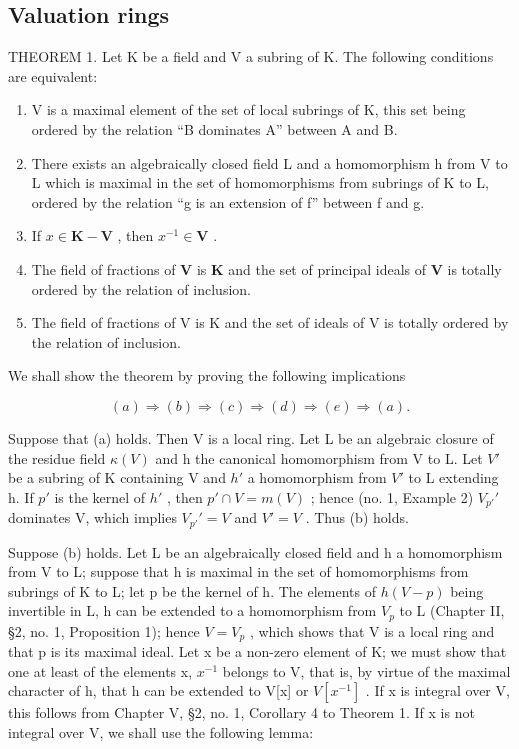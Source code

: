 \subsection{Valuation rings}

THEOREM 1. Let K be a field and V a subring of K. The following conditions are equivalent:

\begin{enumerate}
\def\labelenumi{(\alph{enumi})}
\item
  V is a maximal element of the set of local subrings of K, this set being ordered by the relation ``B dominates A'' between A and B.
\item
  There exists an algebraically closed field L and a homomorphism h from V to L which is maximal in the set of homomorphisms from subrings of K to L, ordered by the relation ``g is an extension of f'' between f and g.
\item
  If \(x \in \mathbf{K} - \mathbf{V}\) , then \(x^{-1} \in \mathbf{V}\) .
\item
  The field of fractions of \(\mathbf{V}\) is \(\mathbf{K}\) and the set of principal ideals of \(\mathbf{V}\) is totally ordered by the relation of inclusion.
\item
  The field of fractions of V is K and the set of ideals of V is totally ordered by the relation of inclusion.
\end{enumerate}

We shall show the theorem by proving the following implications

\[
(a) \Rightarrow (b) \Rightarrow (c) \Rightarrow (d) \Rightarrow (e) \Rightarrow (a).
\]

Suppose that (a) holds. Then V is a local ring. Let L be an algebraic closure of the residue field \(\kappa(V)\) and h the canonical homomorphism from V to L. Let \(V'\) be a subring of K containing V and \(h'\) a homomorphism from \(V'\) to L extending h. If \(p'\) is the kernel of \(h'\) , then \(p' \cap V = m(V)\) ; hence (no. 1, Example 2) \(V_{p'}'\) dominates V, which implies \(V_{p'}' = V\) and \(V' = V\) . Thus (b) holds.

Suppose (b) holds. Let L be an algebraically closed field and h a homomorphism from V to L; suppose that h is maximal in the set of homomorphisms from subrings of K to L; let p be the kernel of h. The elements of \(h(V - p)\) being invertible in L, h can be extended to a homomorphism from \(V_{p}\) to L (Chapter II, §2, no. 1, Proposition 1); hence \(V = V_{p}\) , which shows that V is a local ring and that p is its maximal ideal. Let x be a non-zero element of K; we must show that one at least of the elements x, \(x^{-1}\) belongs to V, that is, by virtue of the maximal character of h, that h can be extended to V{[}x{]} or \(V[x^{-1}]\) . If x is integral over V, this follows from Chapter V, §2, no. 1, Corollary 4 to Theorem 1. If x is not integral over V, we shall use the following lemma:

